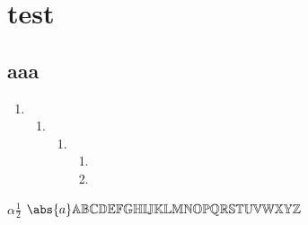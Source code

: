 \documentclass{ctexart}
\begin{document}
\chapter{test}
\section{aaa}
\begin{enumerate}
	\item
	      \begin{enumerate}
		      \item
		            \begin{enumerate}
			            \item
			                  \begin{enumerate}
				                  \item
				                  \item
			                  \end{enumerate}

		            \end{enumerate}

	      \end{enumerate}

\end{enumerate}
\(\alpha \frac{1}{2} \)
\(\abs{a} \mathbb{ABCDEFGHIJKLMNOPQRSTUVWXYZ}\)
\end{document}
